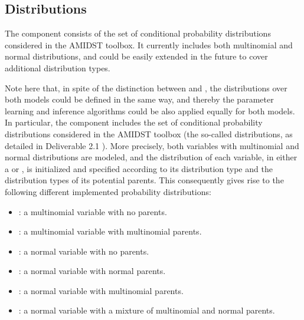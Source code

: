\subsection{Distributions} \label{subsec:Distributions}

The  component consists of the set of conditional probability distributions considered in the AMIDST toolbox. It currently includes both multinomial and normal distributions, and could be easily extended in the future to cover additional distribution types.

Note here that, in spite of the distinction between  and , the distributions over both models could be defined in the same way, and thereby the parameter learning and inference algorithms could be also applied equally for both models. In particular, the  component includes the set of conditional probability distributions considered in the AMIDST toolbox (the so-called  distributions, as detailed in Deliverable 2.1 \cite{Deliverable2.1}). More precisely, both variables with multinomial and normal distributions are modeled, and the distribution of each variable, in either a  or , is initialized and specified according to its distribution type and the distribution types of its potential parents. This consequently gives rise to the following different implemented probability distributions:

\begin{itemize}
  \item {}: a multinomial variable with no parents.
  \item {}: a multinomial variable with multinomial parents.
  \item {}: a normal variable with no parents.
  \item {}: a normal variable with normal parents.
  \item {}: a normal variable with multinomial parents.
  \item {}: a normal variable with a mixture of multinomial and normal parents.
\end{itemize}

